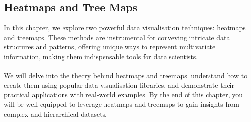 \documentclass{article}\usepackage[]{graphicx}\usepackage[]{xcolor}
\begin{document}
\subsection{Heatmaps and Tree Maps}
In this chapter, we explore two powerful data visualisation techniques: heatmaps and treemaps. These methods are instrumental for conveying intricate data structures and patterns, offering unique ways to represent multivariate information, making them indispensable tools for data scientists.
\\  
\\We will delve into the theory behind heatmaps and treemaps, understand how to create them using popular data visualisation libraries, and demonstrate their practical applications with real-world examples. By the end of this chapter, you will be well-equipped to leverage heatmaps and treemaps to gain insights from complex and hierarchical datasets.
\end{document}
